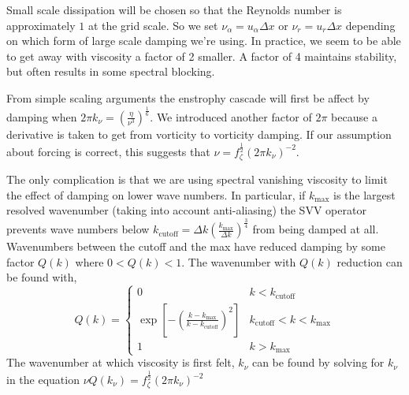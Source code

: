 \documentclass[11pt]{article}
\begin{document}
Small scale dissipation will be chosen so that the Reynolds number is approximately $1$ at the grid scale. So we set $\nu_\alpha=u_\alpha \Delta x$ or $\nu_r=u_r \Delta x$ depending on which form of large scale damping we're using. In practice, we seem to be able to get away with viscosity a factor of 2 smaller. A factor of 4 maintains stability, but often results in some spectral blocking.

From simple scaling arguments the enstrophy cascade will first be affect by damping when $ 2 \pi k_\nu=\left( \frac{ \eta}{\nu^3} \right)^{\frac{1}{6}}$. We introduced another factor of $2\pi$ because a derivative is taken to get from vorticity to vorticity damping. If our assumption about forcing is correct, this suggests that $\nu = f_\zeta^\frac{1}{2} (2 \pi k_\nu)^{-2}$.

The only complication is that we are using spectral vanishing viscosity to limit the effect of damping on lower wave numbers. In particular, if $k_{\textrm{max}}$ is the largest resolved wavenumber (taking into account anti-aliasing) the SVV operator prevents wave numbers below $k_{\textrm{cutoff}}=\Delta k \left(\frac{k_{\textrm{max}}}{\Delta k} \right)^{\frac{3}{4}}$ from being damped at all. Wavenumbers between the cutoff and the max have reduced damping by some factor $Q(k)$ where $0<Q(k)<1$. The wavenumber with $Q(k)$ reduction can be found with,
\begin{equation}
Q(k) = 
\begin{cases}
0 & k < k_{\textrm{cutoff}} \\
\exp \left[ - \left( \frac{k-k_{\textrm{max}}}{k-k_{\textrm{cutoff}}} \right)^2 \right] & k_{\textrm{cutoff}} < k < k_{\textrm{max}} \\
1 & k > k_{\textrm{max}}
\end{cases}
\end{equation}
The wavenumber at which viscosity is first felt, $k_\nu$ can be found by solving for $k_\nu$ in the equation $\nu Q(k_\nu) = f_\zeta^\frac{1}{2} (2 \pi k_\nu)^{-2}$
\end{document}
